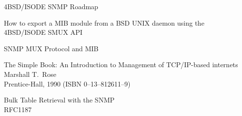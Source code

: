 \begin{bwslide}

\begin{nrtc}
\item	4BSD/ISODE SNMP Roadmap

\item	How to export a MIB module from a BSD UNIX daemon using the
	4BSD/ISODE SMUX API

\item	SNMP MUX Protocol and MIB

\item	The Simple Book: An Introduction to Management of TCP/IP-based
	internets\\
	Marshall T.~Rose\\
	Prentice-Hall, 1990 (ISBN 0--13--812611--9)

\item	Bulk Table Retrieval with the SNMP\\
	RFC1187
\end{nrtc}
\end{bwslide}
